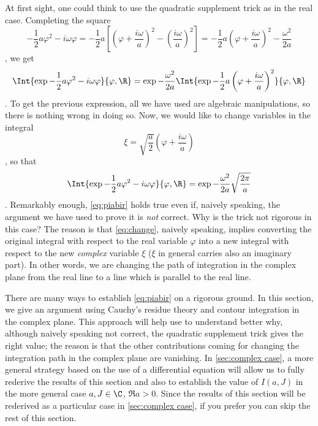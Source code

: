 At first sight,  one could think to use the quadratic supplement trick as in the
real case.
Completing the square 
\begin{dmath*}[compact]
   -\frac{1}{2}a\varphi^{2} - i\omega \varphi =
   -\frac{1}{2}a \left[  \left( \varphi + \frac{i\omega }{a} \right)^{2} - \left(
	 \frac{i\omega}{a} \right)^{2} \right]
   = -\frac{1}{2}a \left( \varphi + \frac{i\omega}{a} \right)^{2} -
   \frac{\omega^{2}}{2a} 
\end{dmath*},
we get
\begin{dmath*}%
   \Int{\exp{-\frac{1}{2}a\varphi^{2} - i\omega \varphi}}{\varphi, \R} =
   \exp{-\frac{\omega^{2}}{2a}} \Int{\exp{-\frac{1}{2}a \left( \varphi +
	 \frac{i\omega}{a} \right)^{2}}}{\varphi, \R}
\end{dmath*}.
To get the previous expression, all we have used are algebraic manipulations,
so there is nothing wrong in doing so.
Now, we would like to change variables in the integral
\begin{dmath}[label={change}]
   \xi = \sqrt{\frac{a}{2}} \left( \varphi + \frac{i\omega}{a} \right) 
\end{dmath},
so that 
\begin{dmath}[label={piabir}]
   \Int{\exp{-\frac{1}{2}a\varphi^{2} -i\omega \varphi}}{\varphi, \R} =
\exp{-\frac{\omega^{2}}{2a}} \sqrt{\frac{2\pi}{a}}
\end{dmath}.
Remarkably enough, \cref{eq:piabir} holds true even if, naively speaking, the
argument we have used to prove it is \emph{not} correct. Why is the trick not
rigorous in this case? The reason is that \cref{eq:change}, naively speaking, implies converting the
original integral with respect to the real variable $\varphi$ into a new
integral with respect to the new \emph{complex} variable $\xi$ ($\xi$ in general
carries also an imaginary part). In other words, we are changing the path of
integration in the complex plane from the real line to a line which is parallel
to the real line. 


There are many ways to establish \cref{eq:piabir} on a rigorous ground.
In this section, we give an argument using Cauchy's residue theory and contour
integration in the complex plane. This approach will help use to understand
better why, although naively speaking not correct, the quadratic supplement
trick gives the right value; the reason is that the other contributions coming
for changing the integration path in the complex plane are vanishing. In
\cref{sec:complex case}, a more general strategy based on the use of a
differential equation will allow us to fully rederive the results of this
section and also to establish the value of $I(a,J)$ in the more general case
$a,J\in\C$, $\Re a >0$. Since the results of this section will be rederived as
a particular case in \cref{sec:complex case}, if you prefer you can skip the
rest of this section.

